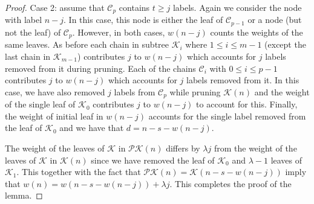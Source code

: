 \documentclass[12pt]{amsart}
\numberwithin{equation}{section}
\numberwithin{theorem}{section}
\numberwithin{table}{section}
\numberwithin{figure}{section}
\begin{document}
\begin{proof}
Case 2: assume that ${\mathcal C}_p$ contains $t \geq j$ labels. Again we consider the node with label $n-j$. In this case, this node is either the leaf of ${\mathcal C}_{p-1}$ or a node (but not the leaf) of ${\mathcal C}_p$. However, in both cases, $w(n-j)$ counts the weights of the same leaves. As before each chain in subtree ${\mathcal K}_i$ where $1 \leq i \leq m-1$ (except the last chain in ${\mathcal K}_{m-1}$) contributes $j$ to $w(n-j)$ which accounts for $j$ labels removed from it during pruning. Each of the chains ${\mathcal C}_i$ with $0 \leq i \leq p - 1$ contributes $j$ to $w(n-j)$ which accounts for $j$ labels removed from it. In this case, we have also removed $j$ labels from ${\mathcal C}_p$ while pruning ${\mathcal K}(n)$ and the weight of the single leaf of ${\mathcal K}_0$ contributes $j$ to $w(n-j)$ to account for this. Finally, the weight of initial leaf in $w(n-j)$ accounts for the single label removed from the leaf of ${\mathcal K}_0$ and we have that $d=n-s-w(n-j)$.

The weight of the leaves of ${\mathcal K}$ in ${\mathcal P} {\mathcal K}(n)$ differs by $\lambda j$ from the weight of the leaves of ${\mathcal K}$ in ${\mathcal K}(n)$ since we have removed the leaf of ${\mathcal K}_0$ and $\lambda-1$ leaves of ${\mathcal K}_1$. This together with the fact that ${\mathcal P} {\mathcal K}(n) = {\mathcal K}(n-s-w(n-j))$ imply that $w(n) = w(n-s-w(n-j)) + \lambda j$. This completes the proof of the lemma.

\end{proof}

\iffalse
Theorem \ref{thm:count} now follows from Lemma \ref{lemma:prun} by induction.
Armed with this lemma, we now prove theorem (\ref{thm:count}).

\begin{proof}

We prove this theorem by induction on $n$.

First note that $w_{j,s}(1)=\ldots=w_{j,s}(s+1)=1$ since the only leaf with label less than $s+1$ is initial node. Also $w_{j,s}(s+2)=\ldots=w_{j,s}(s+j+1)=j+1$ since now we count both initial node and the leaf of ${\mathcal T}_0$ with weight $j$. Therefore, from initial conditions $g_{j,s}(n)=w_{j,s}(n)$ for $n \leq s+j+1$.

Now we let $n>s+j+1$ and we assume that for all $k<n$ we have $g_{j,s}(k)=w_{j,s}(k)$. Note that $n-s-g_{j,s}(n-j)=n-s-w_{j,s}(n-j) > 0 $ and by previous lemma $g_{j,s}(n) = g_{j,s}(n-s-g_{j,s}(n-j)) + j = w_{j,s}(n-s-w_{j,s}(n-j)) + j = w_{j,s}(n)$ as required.

\end{proof}
\fi
\end{document}
